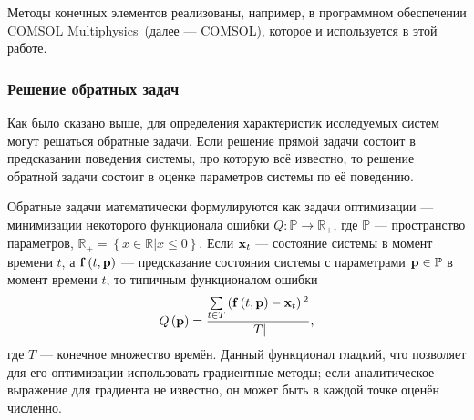\documentclass[oneside,final,12pt]{extreport}
\begin{document}
Методы конечных элементов реализованы, например, в программном обеспечении
COMSOL Multiphysics\texttrademark\ (далее --- COMSOL),
которое и используется в этой работе.

\subsubsection*{Решение обратных задач}
Как было сказано выше, для определения характеристик исследуемых систем
могут решаться обратные задачи.
Если решение прямой задачи состоит в предсказании поведения системы,
про которую всё известно, то решение обратной задачи состоит в оценке
параметров системы по её поведению.

Обратные задачи математически формулируются как задачи оптимизации ---
минимизации некоторого функционала ошибки $Q:\mathbb{P}\rightarrow\mathbb{R}_+$,
где $\mathbb{P}$ --- пространство параметров,
$\mathbb{R}_+ = \left\{x\in\mathbb{R}|x\leqslant0\right\}$.
Если $\vb x_{t}$ --- состояние системы в момент времени $t$, а
$\vb f\left(t,\vb p\right)$ --- предсказание состояния системы с параметрами
$\vb p \in \mathbb{P}$ в момент времени $t$, то
типичным функционалом ошибки
\begin{equation}
Q\left(\vb p\right) =
  \frac{\sum\limits_{t\in T}\left(\vb f\left(t,\vb p\right) - \vb x_t\right){}^2}
       {\left|T\right|},
\end{equation}
где $T$ --- конечное множество времён.
Данный функционал гладкий, что позволяет для его оптимизации использовать
градиентные методы; если аналитическое выражение для градиента не известно,
он может быть в каждой точке оценён численно.
\end{document}
